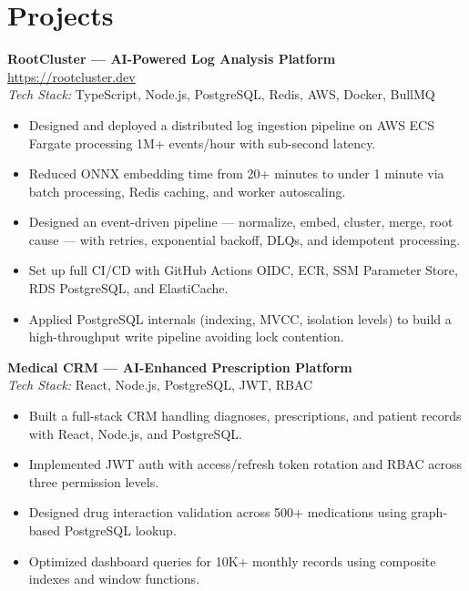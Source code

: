 \documentclass[11pt]{article}
\begin{document}
\section{Projects}
\textbf{RootCluster — AI-Powered Log Analysis Platform} \href{https://rootcluster.dev}{https://rootcluster.dev}\\
\textit{Tech Stack:} TypeScript, Node.js, PostgreSQL, Redis, AWS, Docker, BullMQ\\
\begin{itemize}
\item Designed and deployed a distributed log ingestion pipeline on AWS ECS Fargate processing 1M+ events/hour with sub-second latency.
\item Reduced ONNX embedding time from 20+ minutes to under 1 minute via batch processing, Redis caching, and worker autoscaling.
\item Designed an event-driven pipeline — normalize, embed, cluster, merge, root cause — with retries, exponential backoff, DLQs, and idempotent processing.
\item Set up full CI/CD with GitHub Actions OIDC, ECR, SSM Parameter Store, RDS PostgreSQL, and ElastiCache.
\item Applied PostgreSQL internals (indexing, MVCC, isolation levels) to build a high-throughput write pipeline avoiding lock contention.
\end{itemize}

\textbf{Medical CRM — AI-Enhanced Prescription Platform}\\
\textit{Tech Stack:} React, Node.js, PostgreSQL, JWT, RBAC\\
\begin{itemize}
\item Built a full-stack CRM handling diagnoses, prescriptions, and patient records with React, Node.js, and PostgreSQL.
\item Implemented JWT auth with access/refresh token rotation and RBAC across three permission levels.
\item Designed drug interaction validation across 500+ medications using graph-based PostgreSQL lookup.
\item Optimized dashboard queries for 10K+ monthly records using composite indexes and window functions.
\end{itemize}
\end{document}
